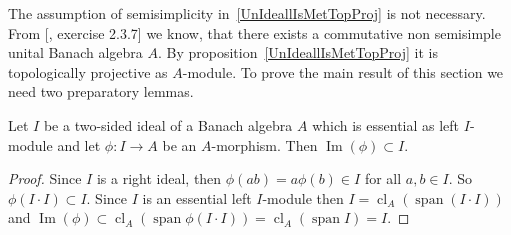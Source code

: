 The assumption of semisimplicity in~\ref{UnIdeallIsMetTopProj} is not necessary.
From [\cite{DalesIntroBanAlgOpHarmAnal}, exercise 2.3.7] we know, that there
exists a commutative non semisimple unital Banach algebra $A$. By
proposition~\ref{UnIdeallIsMetTopProj} it is topologically projective as
$A$-module. To prove the main result of this section we need two preparatory
lemmas.

\begin{lemma}\label{ImgOfAMorphFromBiIdToA} Let $I$ be a two-sided ideal of a
Banach algebra $A$ which is essential as left $I$-module and let $\phi:I\to A$
be an $A$-morphism. Then $\operatorname{Im}(\phi)\subset I$.
\end{lemma}
\begin{proof} Since $I$ is a right ideal, then $\phi(ab)=a\phi(b)\in I$ for all
$a,b\in I$. So $\phi(I\cdot I)\subset I$. Since $I$ is an essential left
$I$-module then $I=\operatorname{cl}_A(\operatorname{span}(I\cdot I))$ and
$\operatorname{Im}(\phi)
\subset\operatorname{cl}_A(\operatorname{span}\phi(I\cdot I))
=\operatorname{cl}_A(\operatorname{span}I)
=I$.
\end{proof}


